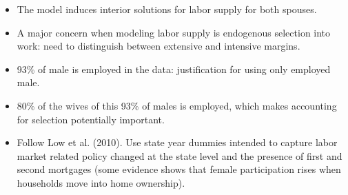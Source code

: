 \documentclass[notes=show]{beamer}
\begin{document}
\begin{frame}%


\begin{itemize}
\item The model induces interior solutions for labor supply for both spouses.

\item A major concern when modeling labor supply is endogenous selection
into work: need to distinguish between extensive and intensive margins.

\item 93\% of male is employed in the data: justification for using only
employed male.

\item 80\% of the wives of this 93\% of males is employed, which makes
accounting for selection potentially important.

\item Follow Low et al. (2010). Use state year dummies intended to capture
labor market related policy changed at the state level and the presence of
first and second mortgages (some evidence shows that female participation
rises when households move into home ownership).
\end{itemize}

\transboxout%
\end{frame}%

\bigskip
\end{document}
